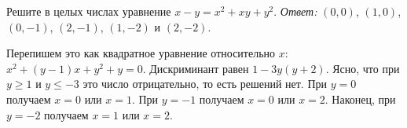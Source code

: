 \problem
Решите в целых числах уравнение $x - y = x^2 + x y + y^2$.
\solution
\emph{Ответ:} $(0, 0)$, $(1, 0)$, $(0, -1)$, $(2, -1)$, $(1, -2)$ и $(2, -2)$.
\par
Перепишем это как квадратное уравнение относительно $x$:
$x^2 + (y - 1) x + y^2 + y = 0$.
Дискриминант равен $1 - 3 y (y + 2)$.
Ясно, что при $y \geq 1$ и $y \leq -3$ это число отрицательно, то есть
решений нет.
При $y = 0$ получаем $x = 0$ или $x = 1$.
При $y = -1$ получаем $x = 0$ или $x = 2$.
Наконец, при $y = -2$ получаем $x = 1$ или $x = 2$.
\endproblem
